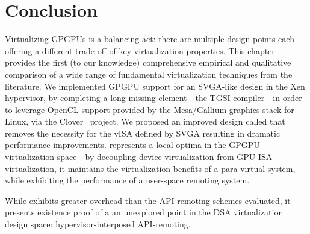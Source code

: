 \section{Conclusion}
\label{sec_con}

Virtualizing GPGPUs is a balancing act: there are multiple design points each
offering a different trade-off of key virtualization properties. This chapter
provides the first (to our knowledge) comprehensive empirical and qualitative
comparison of a wide range of fundamental virtualization techniques from the
literature.
We implemented GPGPU support for an SVGA-like design in the Xen hypervisor, by
completing a long-missing element---the TGSI compiler---in order to leverage
OpenCL support provided by the Mesa/Gallium graphics stack for Linux, via the
Clover~\cite{GalliumCompute-web} project.
We proposed an improved design called \Trillium that removes the necessity for
the vISA defined by SVGA resulting in dramatic performance improvements.
\Trillium represents a local optima in the GPGPU virtualization space---by
decoupling device virtualization from GPU ISA virtualization, it maintains the
virtualization benefits of a para-virtual system, while exhibiting the
performance of a user-space remoting system.

While \Trillium exhibits greater overhead than the API-remoting schemes
evaluated, it presents existence proof of a an unexplored point in the DSA
virtualization design space: hypervisor-interposed API-remoting.
